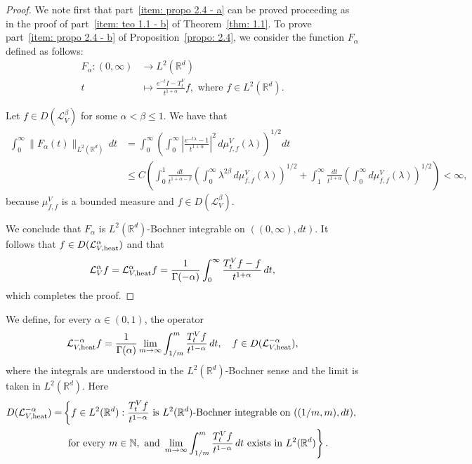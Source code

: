 \documentclass[10pt, a4paper, reqno]{amsart}
\theoremstyle{definition}
\theoremstyle{remark}
\numberwithin{equation}{section}
\begin{document}
\begin{proof}
    We note first that part~\ref{item: propo 2.4 - a} can be proved proceeding as in the proof of part~\ref{item: teo 1.1 - b} of Theorem~\ref{thm: 1.1}. To prove part~\ref{item: propo 2.4 - b} of Proposition~\ref{propo: 2.4}, we consider the function $F_\alpha$ defined as follows:
\begin{equation*}
    \begin{aligned}
F_\alpha: (0,\infty) & \rightarrow L^2(\mathbb{R}^d) \\
t & \mapsto \frac{e^{-t}I - T_t^V}{t^{1+\alpha}} f, \text{ where } f\in L^2(\mathbb R^d). 
\end{aligned}
\end{equation*} 
    
    
    Let $f \in D(\mathcal{L}_V^\beta)$ for some $\alpha < \beta \leq 1$. We have that
    \begin{equation*}
        \begin{split}
            \int_0^\infty \|F_\alpha(t)\|_{L^2(\mathbb{R}^d)} \, dt & = \int_0^\infty \left( \int_0^\infty \left| \frac{e^{-t\lambda} - 1}{t^{1+\alpha}} \right|^2 \, d\mu_{f,f}^V(\lambda) \right)^{1/2} dt \\
            & \leq C \left( \int_0^1 \frac{dt}{t^{1+\alpha-\beta}} \left( \int_0^\infty \lambda^{2\beta} \, d\mu_{f,f}^V(\lambda) \right)^{1/2} + \int_1^\infty \frac{dt}{t^{1+\alpha}} \left(\int_0^\infty d\mu_{f,f}^V(\lambda)\right)^{1/2} \right) < \infty,
        \end{split}
    \end{equation*}
    because $\mu_{f,f}^V$ is a bounded measure and $f \in D(\mathcal{L}_V^\beta)$. 

    We conclude that $F_\alpha$ is $L^2(\mathbb{R}^d)$-Bochner integrable on $((0,\infty), dt)$. It follows that $f \in D(\mathcal{L}_{V,\textup{heat}}^\alpha)$ and that 
    \[
    \mathcal{L}_V^\alpha f = \mathcal{L}_{V,\textup{heat}}^\alpha f = \frac{1}{\Gamma(-\alpha)} \int_0^\infty \frac{T_t^V f - f}{t^{1+\alpha}} \, dt,
    \]
    which completes the proof.
\end{proof}


We define, for every $\alpha \in (0,1)$, the operator 
\[ 
\mathcal{L}_{V,\textup{heat}}^{-\alpha} f = \frac{1}{\Gamma(\alpha)} \lim_{m \rightarrow \infty} \int_{1/m}^m \frac{T_t^V f}{t^{1-\alpha}} \, dt, \quad f \in D(\mathcal{L}_{V,\textup{heat}}^{-\alpha}), 
\]
where the integrals are understood in the $L^2(\mathbb{R}^d)$-Bochner sense and the limit is taken in $L^2(\mathbb{R}^d)$. Here
\begin{equation*}
\begin{split}
    D(\mathcal{L}_{V,\textup{heat}}^{-\alpha}) = & \left\{ f \in L^2(\mathbb{R}^d) : \frac{T_t^V f}{t^{1-\alpha}} \text{ is } L^2(\mathbb{R}^d)\text{-Bochner integrable on } ((1/m,m), dt),\right. \\
    & \left. \text{ for every } m \in \mathbb{N}, \text{ and } \lim_{m \rightarrow \infty} \int_{1/m}^m \frac{T_t^V f}{t^{1-\alpha}} \, dt \text{ exists in } L^2(\mathbb{R}^d) \right\}.
\end{split}
\end{equation*}
\end{document}
